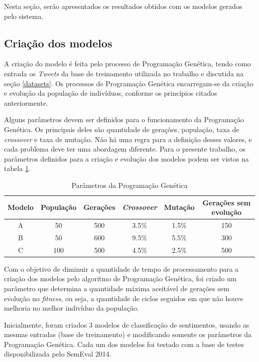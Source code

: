 \documentclass[12pt]{article}
\begin{document}
Nesta seção, serão apresentados os resultados obtidos com os modelos gerados pelo sistema. 

\subsection{Criação dos modelos}

A criação do modelo é feita pelo processo de Programação Genética, tendo como entrada os \emph{Tweets} da base de treinamento utilizada no trabalho e discutida na seção \ref{datasets}. Os processos de Programação Genética encarregam-se da criação e evolução da população de indivíduos, conforme os princípios citados anteriormente.

Alguns parâmetros devem ser definidos para o funcionamento da Programação Genética. Os principais deles são quantidade de gerações, população, taxa de \emph{crossover} e taxa de mutação. Não há uma regra para a definição desses valores, e cada problema deve ter uma abordagem diferente. Para o presente trabalho, os parâmetros definidos para a criação e evolução dos modelos podem ser vistos na tabela \ref{parametersGP}.

\begin{table}[H]
	\centering
	\begin{tabular}{cccccc}
	\textbf{Modelo} & \textbf{População} & \textbf{Gerações} & \textbf{\emph{Crossover}} & \textbf{Mutação} & \textbf{Gerações sem evolução} \\ \hline
	A & 50 & 500 & 3.5\% & 1.5\% & 150 \\ \hline
	B & 50 & 600 & 9.5\% & 5.5\% & 300 \\ \hline
	C & 100 & 500 & 4.5\% & 2.5\% & 500 \\ \hline
	\end{tabular}
	\caption{Parâmetros da Programação Genética}
	\label{parametersGP}
\end{table}

Com o objetivo de diminuir a quantidade de tempo de processamento para a criação dos modelos pelo algoritmo de Programação Genética, foi criado um parâmetro que determina a quantidade máxima aceitável de gerações sem evolução no \emph{fitness}, ou seja, a quantidade de ciclos seguidos em que não houve melhoria no melhor indivíduo da população. 

Inicialmente, foram criados 3 modelos de classificação de sentimentos, usando as mesmas entradas (base de treinamento) e modificando somente os parâmetros da Programação Genética. Cada um dos modelos foi testado com a base de testes disponibilizada pelo SemEval 2014.
\end{document}
